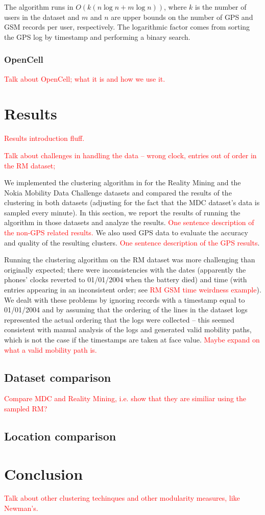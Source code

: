 \documentclass[a4paper,12pt]{article}
\newcommand{\xxx}[1]{\textcolor{red}{#1}}
\begin{document}
The algorithm runs in $O(k(n\log n + m\log n))$, where $k$ is the number of users in the dataset and $m$ and $n$ are upper bounds on the number of GPS and GSM records per user, respectively. The logarithmic factor comes from sorting the GPS log by timestamp and performing a binary search.

\subsubsection{OpenCell}

\xxx{Talk about OpenCell; what it is and how we use it.}

\section{Results}

\xxx{Results introduction fluff.}

\xxx{Talk about challenges in handling the data -- wrong clock, entries out of order in the RM dataset;}

We implemented the clustering algorithm in \cite{mobilityprofiler} for the Reality Mining and the Nokia Mobility Data Challenge datasets and compared the results of the clustering in both datasets (adjusting for the fact that the MDC dataset's data is sampled every minute). In this section, we report the results of running the algorithm in those datasets and analyze the results. \xxx{One sentence description of the non-GPS related results.} We also used GPS data to evaluate the accuracy and quality of the resulting clusters. \xxx{One sentence description of the GPS results}.

Running the clustering algorithm on the RM dataset was more challenging than originally expected; there were inconsistencies with the dates (apparently the phones' clocks reverted to 01/01/2004 when the battery died) and time (with entries appearing in an inconsistent order; see \xxx{RM GSM time weirdness example}). We dealt with these problems by ignoring records with a timestamp equal to 01/01/2004 and by assuming that the ordering of the lines in the dataset logs represented the actual ordering that the logs were collected -- this seemed consistent with manual analysis of the logs and generated valid mobility paths, which is not the case if the timestamps are taken at face value. \xxx{Maybe expand on what a valid mobility path is.}

\subsection{Dataset comparison}

\xxx{Compare MDC and Reality Mining, i.e. show that they are similiar using the sampled RM?}

\subsection{Location comparison}

\section{Conclusion}

\xxx{Talk about other clustering techinques and other modularity measures, like Newman's.}



\end{document}
